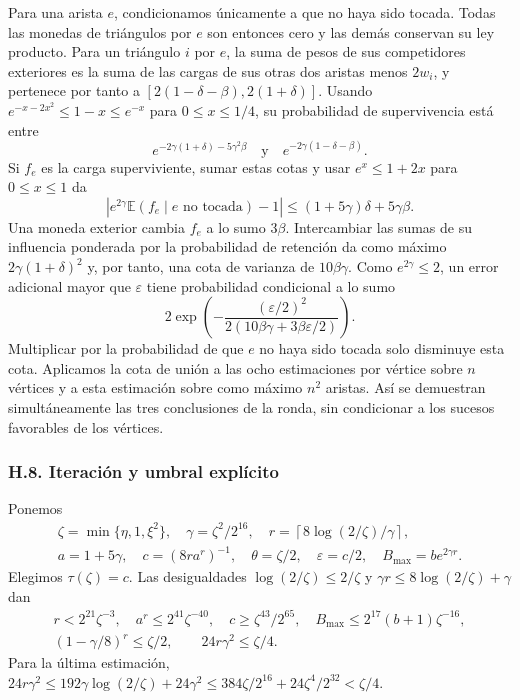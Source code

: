 \documentclass[spanish,11pt,a4paper]{article}
\begin{document}
Para una arista \(e\), condicionamos únicamente a que no haya sido tocada. Todas las monedas de triángulos por \(e\) son entonces cero y las demás conservan su ley producto. Para un triángulo \(i\) por \(e\), la suma de pesos de sus competidores exteriores es la suma de las cargas de sus otras dos aristas menos \(2w_i\), y pertenece por tanto a \([2(1-\delta-\beta),2(1+\delta)]\). Usando \(e^{-x-2x^2}\le1-x\le e^{-x}\) para \(0\le x\le1/4\), su probabilidad de supervivencia está entre \[e^{-2\gamma(1+\delta)-5\gamma^2\beta}
\quad\text{y}\quad e^{-2\gamma(1-\delta-\beta)}.\] Si \(f_e\) es la carga superviviente, sumar estas cotas y usar \(e^x\le1+2x\) para \(0\le x\le1\) da \[|e^{2\gamma}\mathbb E(f_e\mid e\text{ no tocada})-1|
\le(1+5\gamma)\delta+5\gamma\beta.\] Una moneda exterior cambia \(f_e\) a lo sumo \(3\beta\). Intercambiar las sumas de su influencia ponderada por la probabilidad de retención da como máximo \(2\gamma(1+\delta)^2\) y, por tanto, una cota de varianza de \(10\beta\gamma\). Como \(e^{2\gamma}\le2\), un error adicional mayor que \(\varepsilon\) tiene probabilidad condicional a lo sumo \[2\exp\left(-\frac{(\varepsilon/2)^2}
{2(10\beta\gamma+3\beta\varepsilon/2)}\right).\] Multiplicar por la probabilidad de que \(e\) no haya sido tocada solo disminuye esta cota. Aplicamos la cota de unión a las ocho estimaciones por vértice sobre \(n\) vértices y a esta estimación sobre como máximo \(n^2\) aristas. Así se demuestran simultáneamente las tres conclusiones de la ronda, sin condicionar a los sucesos favorables de los vértices.

\subsubsection{H.8. Iteración y umbral explícito}\label{h.8.-iteraciuxf3n-y-umbral-expluxedcito}

Ponemos \[\begin{gathered}
\zeta=\min\{\eta,1,\xi^2\},\quad \gamma=\zeta^2/2^{16},\quad
r=\left\lceil8\log(2/\zeta)/\gamma\right\rceil,\\
a=1+5\gamma,\quad c=(8ra^r)^{-1},\quad
\theta=\zeta/2,\quad\varepsilon=c/2,\quad B_{\max}=be^{2\gamma r}.
\end{gathered}\] Elegimos \(\tau(\zeta)=c\). Las desigualdades \(\log(2/\zeta)\le2/\zeta\) y \(\gamma r\le8\log(2/\zeta)+\gamma\) dan \[\begin{gathered}
r<2^{21}\zeta^{-3},\quad a^r\le2^{41}\zeta^{-40},\quad
c\ge\zeta^{43}/2^{65},\quad B_{\max}\le2^{17}(b+1)\zeta^{-16},\\
(1-\gamma/8)^r\le\zeta/2,\qquad24r\gamma^2\le\zeta/4.
\end{gathered}\] Para la última estimación, \(24r\gamma^2\le192\gamma\log(2/\zeta)+24\gamma^2\le384\zeta/2^{16}+24\zeta^4/2^{32}<\zeta/4\).
\end{document}
